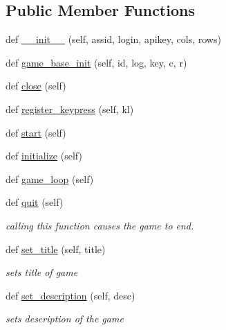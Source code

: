 \subsection*{Public Member Functions}
\begin{DoxyCompactItemize}
\item 
def \hyperlink{classbridges_1_1gamebase_1_1_game_base_a869c20436a432429580f1a4e5fb63b9e}{\+\_\+\+\_\+init\+\_\+\+\_\+} (self, assid, login, apikey, cols, rows)
\item 
def \hyperlink{classbridges_1_1gamebase_1_1_game_base_ad0d97def82fd9c51fd7beed609663d50}{game\+\_\+base\+\_\+init} (self, id, log, key, c, r)
\item 
def \hyperlink{classbridges_1_1gamebase_1_1_game_base_aa30b096b3b2834d36a05acd982625517}{close} (self)
\item 
def \hyperlink{classbridges_1_1gamebase_1_1_game_base_ac60243e192a502fb7be51f86eb5b76b6}{register\+\_\+keypress} (self, kl)
\item 
def \hyperlink{classbridges_1_1gamebase_1_1_game_base_a05a30fccf88c2baba1137b5a06ba2ed7}{start} (self)
\item 
def \hyperlink{classbridges_1_1gamebase_1_1_game_base_a336629d190f1601f1211ca57e4d5427d}{initialize} (self)
\item 
def \hyperlink{classbridges_1_1gamebase_1_1_game_base_af650eeb756558d2cbcae43c74de5cce7}{game\+\_\+loop} (self)
\item 
def \hyperlink{classbridges_1_1gamebase_1_1_game_base_a21742d4e630fa64dc76848c7b4fcb344}{quit} (self)
\begin{DoxyCompactList}\small\item\em calling this function causes the game to end. \end{DoxyCompactList}\item 
def \hyperlink{classbridges_1_1gamebase_1_1_game_base_a7e7d4033c4b191b3699dbf0cb5f25933}{set\+\_\+title} (self, title)
\begin{DoxyCompactList}\small\item\em sets title of game \end{DoxyCompactList}\item 
def \hyperlink{classbridges_1_1gamebase_1_1_game_base_a75ecd56daf08036207772d6ce81c90b1}{set\+\_\+description} (self, desc)
\begin{DoxyCompactList}\small\item\em sets description of the game \end{DoxyCompactList}\item 

\end{DoxyCompactItemize}
